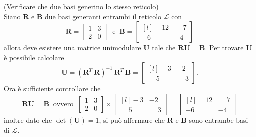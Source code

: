 \begin{exmp} (Verificare che due basi generino lo stesso reticolo)
    \label{exp:basis}
    \\
    Siano $\mathbf{R}$ e $\mathbf{B}$ due basi generanti entrambi il reticolo $\mathcal{L}$
    con
    \begin{equation*}
        \mathbf{R} =
        \begin{bmatrix}
            1 & 3\\
            2 & 0
        \end{bmatrix}
        \ \text{ e } \ 
        \mathbf{B} =
        \begin{bmatrix*}[l]
            \phantom{-}12 & \phantom{-}7\\
            -6 & -4
        \end{bmatrix*}
    \end{equation*}
    allora deve esistere una matrice unimodulare $\mathbf{U}$ tale che 
    $\mathbf{R}\mathbf{U} = \mathbf{B}$. Per trovare $\mathbf{U}$ è possibile
    calcolare
    \begin{equation*}
        \mathbf{U} = (\mathbf{R}^T \ \mathbf{R})^{-1} \ \mathbf{R}^T \ \mathbf{B} =
        \begin{bmatrix*}[l]
            -3 & -2\\
            \phantom{-}5 & \phantom{-}3
        \end{bmatrix*}.
    \end{equation*}
    Ora è sufficiente controllare che
    \begin{equation*}
        \mathbf{RU} = \mathbf{B}
        \ \text{ ovvero } \
        \begin{bmatrix}
            1 & 3\\
            2 & 0
        \end{bmatrix}
        \times
        \begin{bmatrix*}[l]
            -3 & -2\\
            \phantom{-}5 & \phantom{-}3
        \end{bmatrix*}
        =
        \begin{bmatrix*}[l]
            \phantom{-}12 & \phantom{-}7\\
            -6 & -4
        \end{bmatrix*}
    \end{equation*}
inoltre dato che $\det(\mathbf{U}) = 1$, si può affermare che $\mathbf{R}$ e $\mathbf{B}$
sono entrambe basi di $\mathcal{L}$.
\end{exmp}
